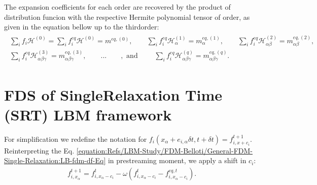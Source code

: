 \documentclass[letterpaper,10pt,english,openany,oneside]{jupyterBook}
\begin{document}
\sphinxAtStartPar
The expansion coefficients for each order are recovered by the product of distribution funcion with the respective Hermite polynomial tensor of order, as given in the equation bellow up to the third\sphinxhyphen{}order:
\begin{equation}\label{equation:Refs/LBM-Study/FDM-Belloti/General-FDM-Single-Relaxation:general-moments-fdm-fi-df}
\begin{split}
\begin{array}{c}
\displaystyle\sum_{i}f_{i}\mathcal{H}^{(0)}=\displaystyle\sum_{i}f_{i}^{eq}\mathcal{H}^{(0)}=m^{eq,(0)}, \qquad \displaystyle\sum_{i}f_{i}^{eq}\mathcal{H}^{(1)}_{\alpha} =m^{eq,(1)}_{\alpha}, \qquad \displaystyle \sum_{i} f_{i}^{eq} \mathcal{H}^{(2)}_{\alpha\beta} =m^{eq,(2)}_{\alpha\beta},\\
\displaystyle\sum_{i} f_{i}^{eq} \mathcal{H}^{(3)}_{\alpha\beta\gamma} = m^{eq,(3)}_{\alpha\beta\gamma}, \qquad ... \qquad, \textrm{ and } \qquad \displaystyle\sum_{i} f_{i}^{eq} \mathcal{H}^{(q)}_{\alpha\beta\gamma} = m^{eq,(q)}_{\alpha\beta\gamma}.
\end{array}
\end{split}
\end{equation}

\section{FDS of Single\sphinxhyphen{}Relaxation Time (SRT) LBM framework}
\label{\detokenize{Refs/LBM-Study/FDM-Belloti/General-FDM-Single-Relaxation:fds-of-single-relaxation-time-srt-lbm-framework}}
\sphinxAtStartPar
For simplification we redefine the notation for \(f_i( x_{\alpha} + e_{i,\alpha} \delta t, t+\delta t)=f_{i,x+c_{i}}^{t+1}\). Reinterpreting the Eq. \eqref{equation:Refs/LBM-Study/FDM-Belloti/General-FDM-Single-Relaxation:LB-fdm-df-Eq} in pre\sphinxhyphen{}streaming moment, we apply a shift in \(c_{i}\):
\begin{equation}\label{equation:Refs/LBM-Study/FDM-Belloti/General-FDM-Single-Relaxation:pre-fdm-LB-df-Eq}
\begin{split}
f_{i,x_{\alpha}}^{t+1}  = f_{i,x_{\alpha}-c_{i}}^{t}  - \omega \left( f_{i,x_{\alpha}-c_{i}}^{t} - f_{i,x_{\alpha}-c_{i}}^{eq,t} \right).
\end{split}
\end{equation}
\end{document}
